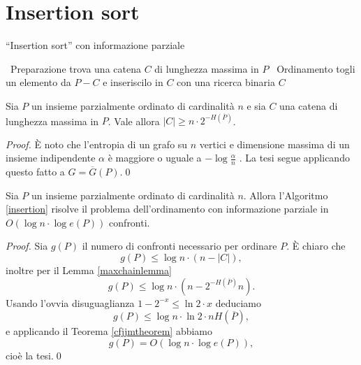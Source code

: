 \section{Insertion sort} 
\begin{algorithm}
  \caption{``Insertion sort'' con informazione parziale} \label{insertion} 
  \begin{algorithmic}
    [1] \STATE \, \COMMENT Preparazione \STATE trova una catena \(C\) di lunghezza massima in \(P\) \STATE \, \COMMENT Ordinamento  \STATE togli un elemento da \(P-C\) e inseriscilo in \(C\) con una ricerca binaria \ENDWHILE \RETURN \(C\) 
  \end{algorithmic}
\end{algorithm}
\begin{lemma}
  \label{maxchainlemma} Sia \(P\) un insieme parzialmente ordinato di cardinalità \(n\) e sia \(C\) una catena di lunghezza massima in \(P\). Vale allora \(\left|C\right|\ge n\cdot2^{-H(\overline{P})}\). 
\end{lemma}
\begin{proof}
  È noto che l'entropia di un grafo su \(n\) vertici e dimensione massima di un insieme indipendente \(\alpha\) è maggiore o uguale a \(-\log{\frac{\alpha}{n}}\) \cite{Cardinal2005}. La tesi segue applicando questo fatto a \(G=\overline{G}(P)\).\qed 
\end{proof}
\begin{theorem}
  Sia \(P\) un insieme parzialmente ordinato di cardinalità \(n\). Allora l'Algoritmo \ref{insertion} risolve il problema dell'ordinamento con informazione parziale in \(O(\log{n}\cdot\log{e(P)})\) confronti. 
\end{theorem}
\begin{proof}
  Sia \(g(P)\) il numero di confronti necessario per ordinare \(P\). È chiaro che
  \[g(P)\le \log{n}\cdot(n-|C|),\]
  inoltre per il Lemma \ref{maxchainlemma}
  \[g(P)\le\log{n}\cdot(n-2^{-H(\overline{P})}n).\]
  Usando l'ovvia disuguaglianza \(1-2^{-x}\le\ln{2}\cdot x\) deduciamo
  \[g(P)\le\log{n}\cdot\ln{2}\cdot nH(\overline{P}),\]
  e applicando il Teorema \ref{cfjjmtheorem} abbiamo
  \[g(P)=O(\log{n}\cdot\log{e(P)}),\]
  cioè la tesi.\qed 
\end{proof}

